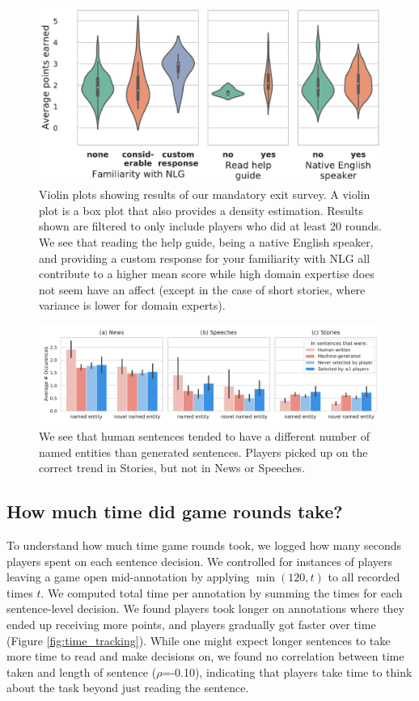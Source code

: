 \begin{figure}[tb]
    \centering
    \includegraphics[width=\linewidth]{figures/survey_results_no_fam.pdf}
    \caption{Violin plots showing results of our mandatory exit survey. A violin plot is a box plot that also provides a density estimation. Results shown are filtered to only include players who did at least 20 rounds. We see that reading the help guide, being a native English speaker, and providing a custom response for your familiarity with NLG all contribute to a higher mean score while high domain expertise does not seem have an affect (except in the case of short stories, where variance is lower for domain experts).}
    \label{fig:survey_results}
\end{figure}

\begin{figure}[tb]
    \centering
    \includegraphics[width=0.8\linewidth]{figures/ner_stats.pdf}
    \caption{We see that human sentences tended to have a different number of named entities than generated sentences.
    Players picked up on the correct trend in Stories, but not in News or Speeches.}
    \label{fig:sentence_stats}
\end{figure}

\subsection{How much time did game rounds take?}
To understand how much time game rounds took, we logged how many seconds players spent on each sentence decision.
We controlled for instances of players leaving a game open mid-annotation by applying $\min(120, t)$ to all recorded times $t$.
We computed total time per annotation by summing the times for each sentence-level decision.
We found players took longer on annotations where they ended up receiving more points, and players gradually got faster over time (Figure \ref{fig:time_tracking}).
While one might expect longer sentences to take more time to read and make decisions on, we found no correlation between time taken and length of sentence ($\rho$=-0.10), indicating that players take time to think about the task beyond just reading the sentence.

